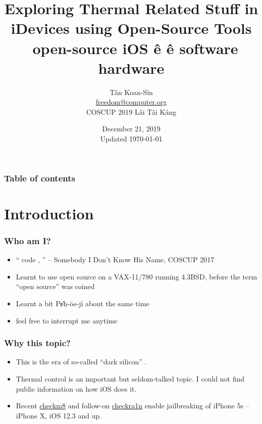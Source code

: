 \documentclass{beamer}
\begin{document}
\title{Exploring Thermal Related Stuff in iDevices using Open-Source Tools \\
  \ open-source     iOS ê      \^e software  hardware}

\author[freedom]{T\^an Koan-S\^in \\ \href{mailto:freedom@computer.org}{freedom@computer.org} \\ COSCUP 2019 Lâi Tâi Káng}
\date{December 21, 2019 \\ Updated \today}

\begin{frame}
  \titlepage
\end{frame}

\begin{frame}
  \frametitle{Table of contents}
  \tableofcontents
\end{frame}

\section{Introduction}
\begin{frame}
  \frametitle{Who am I?}
  \begin{itemize}
  \item ``    code  ,    '' -- Somebody I Don't Know His Name, COSCUP 2017
  \item Learnt to use open source on a VAX-11/780 running 4.3BSD, before the term ``open source'' was coined
  \item Learnt a bit Pe̍h-ōe-jī about the same time
  \item feel free to interrupt me anytime
  \end{itemize}
\end{frame}

\begin{frame}
  \frametitle{Why this topic?}
  \begin{itemize}
  \item This is the era of so-called ``dark silicon'' \cite{Esmaeilzadeh:2011:DSE:2000064.2000108}.
  \item Thermal control is an important but seldom-talked topic. I could not find public information on how iOS does it.
  \item Recent \href{https://github.com/axi0mX/ipwndfu}{checkm8} \cite{checkm8} and follow-on \href{https://checkra.in/}{checkra1n} \cite{checkra1n} enable jailbreaking of iPhone 5s – iPhone X, iOS 12.3 and up.
  \end{itemize}
\end{frame}
\end{document}
